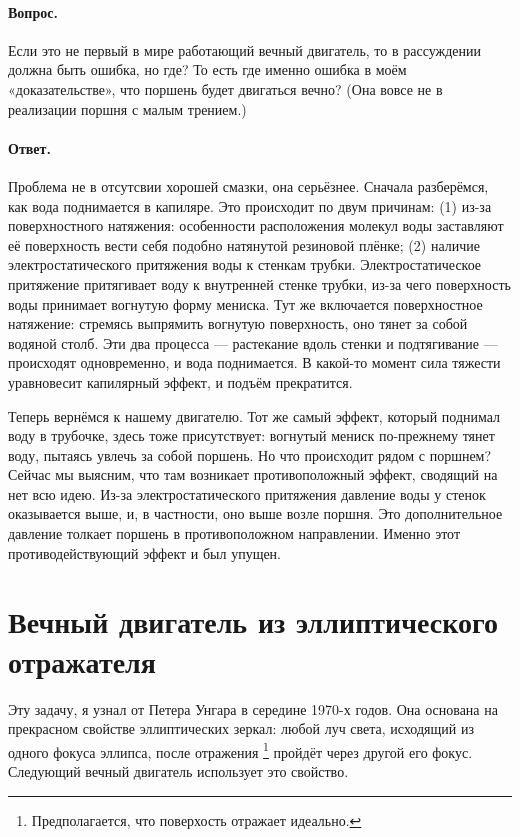 \paragraph{Вопрос.}
Если это не первый в мире работающий вечный двигатель, то в рассуждении должна быть ошибка, но где?
То есть где именно ошибка в моём «доказательстве», что поршень будет двигаться вечно?
(Она вовсе не в реализации поршня с малым трением.)

\paragraph{Ответ.}
Проблема не в отсутсвии хорошей смазки, она серьёзнее.
Сначала разберёмся, как вода поднимается в капиляре.
Это происходит по двум причинам:
(1) из-за поверхностного натяжения:
особенности расположения молекул воды заставляют её поверхность вести себя подобно натянутой резиновой плёнке;
(2) наличие электростатического притяжения воды к стенкам трубки.
Электростатическое притяжение притягивает воду к внутренней стенке трубки, из-за чего поверхность воды принимает вогнутую форму мениска.
Тут же включается поверхностное натяжение: стремясь выпрямить вогнутую поверхность, оно тянет за собой водяной столб.
Эти два процесса — растекание вдоль стенки и подтягивание — происходят одновременно, и вода поднимается.
В какой-то момент сила тяжести уравновесит капилярный эффект, и подъём прекратится.

Теперь вернёмся к нашему двигателю.
Тот же самый эффект, который поднимал воду в трубочке, здесь тоже присутствует: вогнутый мениск по-прежнему тянет воду, пытаясь увлечь за собой поршень.
Но что происходит рядом с поршнем?
Сейчас мы выясним, что там возникает противоположный эффект, сводящий на нет всю идею.
Из-за электростатического притяжения давление воды у стенок оказывается выше, и, в частности, оно выше возле поршня.
Это дополнительное давление толкает поршень в противоположном направлении.
Именно этот противодействующий эффект и был упущен.

\section{Вечный двигатель из эллиптического отражателя}

Эту задачу, я узнал от Петера Унгара в середине
1970-х годов.
Она основана на прекрасном свойстве эллиптических зеркал:
любой луч света, исходящий из одного фокуса эллипса,
после отражения%
\footnote{Предполагается, что поверхость отражает идеально.}
пройдёт через другой его фокус.
Следующий вечный двигатель использует это свойство.

